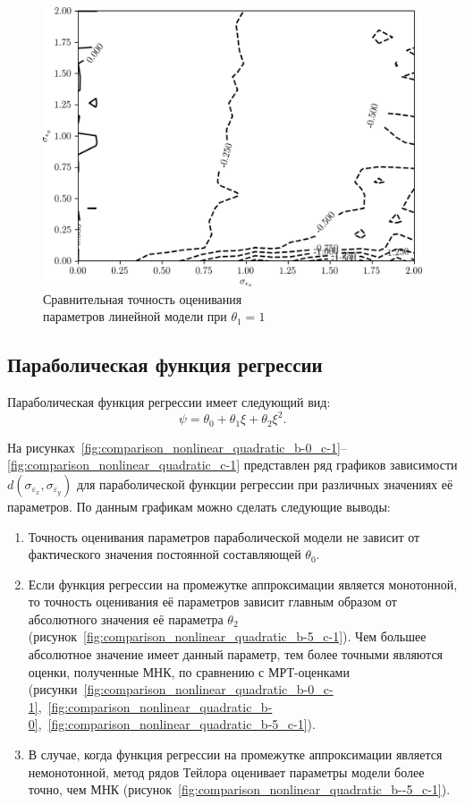 \begin{figure}[b]
  \centering
  \includegraphics[width=135mm]{fig/nonlinear/linear/a-0_b-1.png}
  \caption{
    Сравнительная точность оценивания \\
    параметров линейной модели при \( \theta_1 = 1 \)
  }\label{fig:comparison_nonlinear_linear}
\end{figure}

\vspace{2\baselineskip}
\subsection{Параболическая функция регрессии}

Параболическая функция регрессии имеет следующий вид:
\[ \psi = \theta_0 + \theta_1 \xi + \theta_2 \xi^2. \]

На рисунках~\ref{fig:comparison_nonlinear_quadratic_b-0_c-1}--\ref{fig:comparison_nonlinear_quadratic_c-1} представлен ряд графиков зависимости
\( d(\sigma_{\varepsilon_x}, \sigma_{\varepsilon_y}) \)
для параболической функции регрессии при различных значениях её параметров.
По данным графикам можно сделать следующие выводы:
\begin{enumerate}
\item Точность оценивания параметров параболической модели не зависит
  от фактического значения постоянной составляющей \( \theta_0 \).
\item Если функция регрессии на промежутке аппроксимации является монотонной,
  то точность оценивания её параметров зависит главным образом от
  абсолютного значения её параметра \( \theta_2 \)
  (рисунок~\ref{fig:comparison_nonlinear_quadratic_b-5_c-1}).
  Чем большее абсолютное значение имеет данный параметр,
  тем более точными являются оценки, полученные МНК,
  по сравнению с МРТ-оценками
  (рисунки~\ref{fig:comparison_nonlinear_quadratic_b-0_c-1},~\ref{fig:comparison_nonlinear_quadratic_b-0},~\ref{fig:comparison_nonlinear_quadratic_b-5_c-1}).
\item В случае, когда функция регрессии на промежутке аппроксимации является немонотонной,
  метод рядов Тейлора оценивает параметры модели более точно, чем МНК
  (рисунок~\ref{fig:comparison_nonlinear_quadratic_b--5_c-1}).
\end{enumerate}

